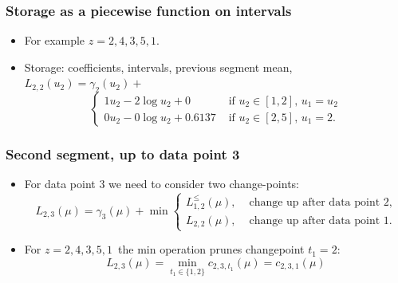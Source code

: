 \documentclass{beamer}
\newcommand{\z}{$z = 2, 4, 3, 5, 1$}
\begin{document}
\begin{frame}
  \frametitle{Storage as a piecewise function on intervals}
  \begin{itemize}
  \item For example \z.
    \begin{center}
      
    \end{center} 
  \item Storage: coefficients, intervals, previous segment mean,
    $L_{2,2}(u_2) = \gamma_2(u_2) +$
    \begin{equation*}
      \begin{cases}
        1u_2 - 2\log u_2 + 0 & \text{ if } u_2\in[1, 2],\, u_1=u_2\\
        0u_2 -0\log u_2 + 0.6137 & \text{ if } u_2\in[2, 5],\, u_1=2.
      \end{cases}
    \end{equation*}
  \end{itemize}
\end{frame}

 
\begin{frame}[fragile]
  \frametitle{Second segment, up to data point 3}
  \begin{itemize}
  \item For data point 3 we need to consider two change-points:
    \begin{equation*}
      L_{2,3}(\mu) =  \gamma_3(\mu) + \min
      \begin{cases}
        L_{1,2}^{\leq}(\mu), & \text{ change up after data point 2},\\
        L_{2,2}(\mu), & \text{ change up after data point 1}. 
      \end{cases}
    \end{equation*}  
  \item For \z\ the min operation prunes changepoint
    $t_1=2$:
$$
L_{2,3}(\mu)=\min_{t_1\in\{1,2\}} c_{2,3,t_1}(\mu) = c_{2,3,1}(\mu)
$$
    \begin{center}
      
    \end{center}
  \end{itemize}
\end{frame}
\end{document}

